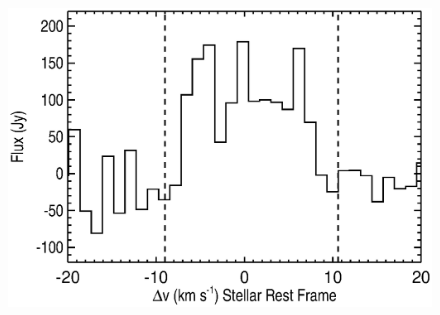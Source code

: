 \documentclass[iop]{emulateapj}
\begin{document}
\begin{figure}[hbt!]
\centering
\includegraphics[trim=60pt 0pt 0pt 0pt, scale=0.55]{f19.eps}
\caption{}
\label{fig:fig8}
\end{figure}
\end{document}
